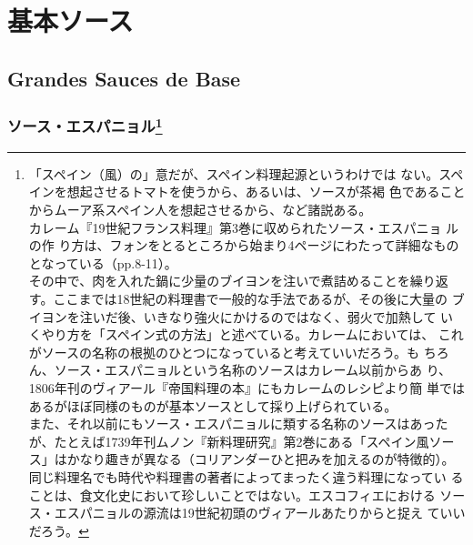 \hypertarget{ux57faux672cux30bdux30fcux30b9}{%
\section{基本ソース}\label{ux57faux672cux30bdux30fcux30b9}}

\hypertarget{grandes-sauces-de-base}{%
\subsection{Grandes Sauces de Base}\label{grandes-sauces-de-base}}

\begin{recette}
\hypertarget{ux30bdux30fcux30b9ux30a8ux30b9ux30d1ux30cbux30e7ux30eb102008}{%
\subsubsection[ソース・エスパニョル]{\texorpdfstring{ソース・エスパニョル\footnote{「スペイン（風）の」意だが、スペイン料理起源というわけでは
  ない。スペインを想起させるトマトを使うから、あるいは、ソースが茶褐
  色であることからムーア系スペイン人を想起させるから、など諸説ある。\\
  カレーム『19世紀フランス料理』第3巻に収められたソース・エスパニョ
  ルの作
  り方は、フォンをとるところから始まり4ページにわたって詳細なものとなっている（pp.8-11）。\\
  その中で、肉を入れた鍋に少量のブイヨンを注いで煮詰めることを繰り返
  す。ここまでは18世紀の料理書で一般的な手法であるが、その後に大量の
  ブイヨンを注いだ後、いきなり強火にかけるのではなく、弱火で加熱して
  いくやり方を「スペイン式の方法」と述べている。カレームにおいては、
  これがソースの名称の根拠のひとつになっていると考えていいだろう。も
  ちろん、ソース・エスパニョルという名称のソースはカレーム以前からあ
  り、1806年刊のヴィアール『帝国料理の本』にもカレームのレシピより簡
  単ではあるがほぼ同様のものが基本ソースとして採り上げられている。\\
  また、それ以前にもソース・エスパニョルに類する名称のソースはあった
  が、たとえば1739年刊ムノン『新料理研究』第2巻にある「スペイン風ソー
  ス」はかなり趣きが異なる（コリアンダーひと把みを加えるのが特徴的）。
  同じ料理名でも時代や料理書の著者によってまったく違う料理になってい
  ることは、食文化史において珍しいことではない。エスコフィエにおける
  ソース・エスパニョルの源流は19世紀初頭のヴィアールあたりからと捉え
  ていいだろう。}}{ソース・エスパニョル}}\label{ux30bdux30fcux30b9ux30a8ux30b9ux30d1ux30cbux30e7ux30eb102008}}


\end{recette}
